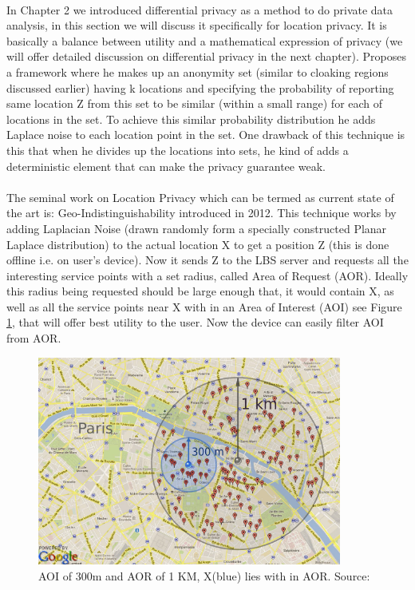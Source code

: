 \documentclass[12pt]{report}
\theoremstyle{named}
\begin{document}
\paragraph{}
In Chapter 2 we introduced differential privacy as a method to do private data analysis, in this section we will discuss it specifically for location privacy. It is basically a balance between utility and a mathematical expression of privacy (we will offer detailed discussion on differential privacy in the next chapter).
\cite{dewri2013local} Proposes a framework where he makes up an anonymity set (similar to cloaking regions discussed earlier) having k locations and specifying the probability of reporting same location Z from this set to be similar (within a small range) for each of locations in the set. To achieve this similar probability distribution he adds Laplace noise to each location point in the set. One drawback of this technique is this that when he divides up the locations into sets, he kind of adds a deterministic element that can make the privacy guarantee weak. 
\paragraph{}
The seminal work on Location Privacy which can be termed as current state of the art is: Geo-Indistinguishability \cite{andres2013geo} introduced in 2012. This technique works by adding Laplacian Noise (drawn randomly form a specially constructed Planar Laplace distribution) to the actual location X to get a position Z (this is done offline i.e. on user's device). Now it sends Z to the LBS server and requests all the interesting service points with a set radius, called Area of Request (AOR). Ideally this radius being requested should be large enough that, it would contain X, as well as all the service points near X with in an Area of Interest (AOI) see Figure \ref{fig:AOIvsAOR}, that will offer best utility to the user. Now the device can easily filter AOI from AOR.
\begin{figure}[ht]
\centering
        \includegraphics[width=100mm,scale=1]{Images/AOIvsAOR.PNG}
    \caption{AOI of 300m and AOR of 1 KM, X(blue) lies with in AOR. Source:\cite{andres2013geo}}
    \label{fig:AOIvsAOR}
\end{figure}
\end{document}
